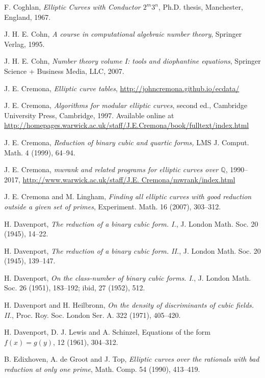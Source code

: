 \begin{thebibliography}{}
F. Coghlan,
\emph{Elliptic Curves with Conductor $2^m3^n$},
Ph.D. thesis, Manchester, England, 1967.

J. H. E. Cohn,
\emph{A course in computational algebraic number theory}, 
Springer Verlag, 1995.

J. H. E. Cohn,
\emph{Number theory volume I: tools and diophantine equations}, 
Springer Science + Business Media, LLC, 2007.

J. E. Cremona,
\emph{Elliptic curve tables}, 
\url{http://johncremona.github.io/ecdata/}

J. E. Cremona,
\emph{Algorithms for modular elliptic curves}, second ed.,
Cambridge University Press, Cambridge, 1997. Available online at 
\url{http://homepages.warwick.ac.uk/staff/J.E.Cremona/book/fulltext/index.html}

J. E. Cremona,
\emph{Reduction of binary cubic and quartic forms,}
LMS J. Comput. Math. 4 (1999), 64--94.

J. E. Cremona, 
\emph{mwrank and related programs for elliptic curves over $\mathbb{Q}$}, 1990--2017,
 \url{http://www.warwick.ac.uk/staff/J.E. Cremona/mwrank/index.html}
  
J. E. Cremona and M. Lingham,
\emph{Finding all elliptic curves with good reduction outside a given set of primes},
Experiment. Math. 16 (2007), 303--312.

H. Davenport,
\emph{The reduction of a binary cubic form. I.},
J. London Math. Soc. 20 (1945), 14--22.

H. Davenport,
\emph{The reduction of a binary cubic form. II.},
J. London Math. Soc. 20 (1945), 139--147.

H. Davenport,
\emph{On the class-number of binary cubic forms. I.},
J. London Math. Soc. 26 (1951), 183--192; ibid,  27 (1952), 512.

H. Davenport and H. Heilbronn,
\emph{On the density of discriminants of cubic fields. II.},
Proc. Roy. Soc. London Ser. A. 322 (1971), 405--420.

H. Davenport, D. J. Lewis and A. Schinzel,
\newblock Equations of the form $f(x)=g(y)$,
 12 (1961), 304--312.

B. Edixhoven, A. de Groot and J. Top,
\emph{Elliptic curves over the rationals with bad reduction at only one prime},
Math. Comp.  54 (1990), 413--419.


\end{thebibliography}
